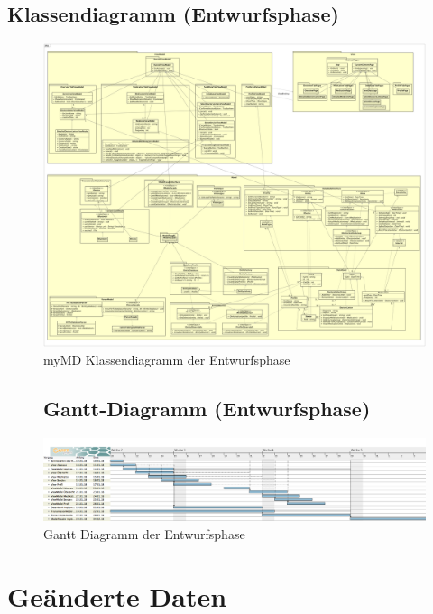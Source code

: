 \documentclass[a4paper]{scrreprt}
\begin{document}
\section{Klassendiagramm (Entwurfsphase)}
\begin{figure}[H]
\hspace{-1.8cm}
\begin{minipage}[c]{\textwidth}
\includegraphics[width=1.6\textwidth, angle=90]{graphics/Klassendiagramme/myMDEntwurf}
\caption{myMD Klassendiagramm der Entwurfsphase}
\end{minipage}
\end{figure}

\begin{figure}
\section{Gantt-Diagramm (Entwurfsphase)}
\begin{minipage}[c]{\textwidth}
\centering
\includegraphics[width=0.95\textheight, angle=90]{Gantt/GanttChart}
\caption{Gantt Diagramm der Entwurfsphase}
\end{minipage}
\end{figure}

\chapter{Geänderte Daten}
\end{document}
